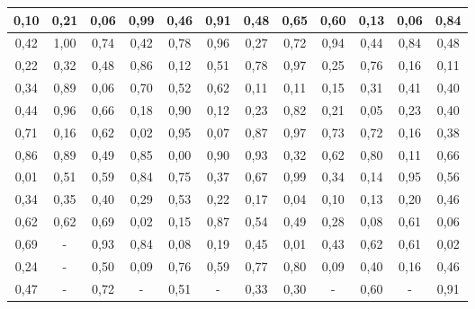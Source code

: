 \begin{table}[H]
\begin{tabular}{|c|c|c|c|c|c|c|c|c|c|c|c|}
0,10 & 0,21 & 0,06 & 0,99 & 0,46 & 0,91 & 0,48 & 0,65 & 0,60 & 0,13 & 0,06 & 0,84 \\ \hline
0,42 & 1,00 & 0,74 & 0,42 & 0,78 & 0,96 & 0,27 & 0,72 & 0,94 & 0,44 & 0,84 & 0,48 \\ \hline
0,22 & 0,32 & 0,48 & 0,86 & 0,12 & 0,51 & 0,78 & 0,97 & 0,25 & 0,76 & 0,16 & 0,11 \\ \hline
0,34 & 0,89 & 0,06 & 0,70 & 0,52 & 0,62 & 0,11 & 0,11 & 0,15 & 0,31 & 0,41 & 0,40 \\ \hline
0,44 & 0,96 & 0,66 & 0,18 & 0,90 & 0,12 & 0,23 & 0,82 & 0,21 & 0,05 & 0,23 & 0,40 \\ \hline
0,71 & 0,16 & 0,62 & 0,02 & 0,95 & 0,07 & 0,87 & 0,97 & 0,73 & 0,72 & 0,16 & 0,38 \\ \hline
0,86 & 0,89 & 0,49 & 0,85 & 0,00 & 0,90 & 0,93 & 0,32 & 0,62 & 0,80 & 0,11 & 0,66 \\ \hline
0,01 & 0,51 & 0,59 & 0,84 & 0,75 & 0,37 & 0,67 & 0,99 & 0,34 & 0,14 & 0,95 & 0,56 \\ \hline
0,34 & 0,35 & 0,40 & 0,29 & 0,53 & 0,22 & 0,17 & 0,04 & 0,10 & 0,13 & 0,20 & 0,46 \\ \hline
0,62 & 0,62 & 0,69 & 0,02 & 0,15 & 0,87 & 0,54 & 0,49 & 0,28 & 0,08 & 0,61 & 0,06 \\ \hline
0,69 & -    & 0,93 & 0,84 & 0,08 & 0,19 & 0,45 & 0,01 & 0,43 & 0,62 & 0,61 & 0,02 \\ \hline
0,24 & -    & 0,50 & 0,09 & 0,76 & 0,59 & 0,77 & 0,80 & 0,09 & 0,40 & 0,16 & 0,46 \\ \hline
0,47 & -    & 0,72 & -    & 0,51 & -    & 0,33 & 0,30 & -    & 0,60 & -    & 0,91 \\ \hline
\end{tabular}
\vspace*{15px}
\end{table}

